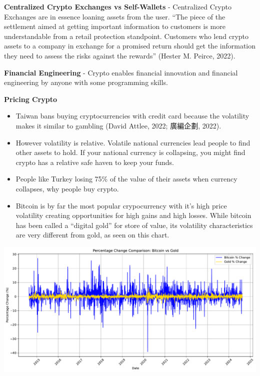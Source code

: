 \documentclass[
  letterpaper,
  DIV=11,
  numbers=noendperiod]{scrartcl}
\begin{document}
\textbf{Centralized Crypto Exchanges vs Self-Wallets} - Centralized
Crypto Exchanges are in essence loaning assets from the user. ``The
piece of the settlement aimed at getting important information to
customers is more understandable from a retail protection standpoint.
Customers who lend crypto assets to a company in exchange for a promised
return should get the information they need to assess the risks against
the rewards'' (Hester M. Peirce, 2022).

\textbf{Financial Engineering} - Crypto enables financial innovation and
financial engineering by anyone with some programming skills.

\textbf{Pricing Crypto}

\begin{itemize}
\item
  Taiwan bans buying cryptocurrencies with credit card because the
  volatility makes it similar to gambling (David Attlee, 2022; 廣編企劃,
  2022).
\item
  However volatility is relative. Volatile national currencies lead
  people to find other assets to hold. If your national currency is
  collapsing, you might find crypto has a relative safe haven to keep
  your funds.
\item
  People like Turkey losing 75\% of the value of their assets when
  currency collapses, why people buy crypto.
\item
  Bitcoin is by far the most popular crypocurrency with it's high price
  volatility creating opportunities for high gains and high losses.
  While bitcoin has been called a ``digital gold'' for store of value,
  its volatility characteristics are very different from gold, as seen
  on this chart.
\end{itemize}

\includegraphics{_thesis_files/figure-pdf/cell-44-output-1.pdf}
\end{document}
